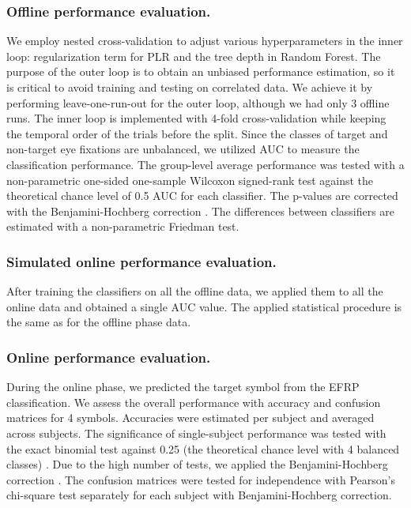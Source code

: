 \documentclass[12pt]{iopart}
\begin{document}
\subsubsection*{Offline performance evaluation.}
We employ nested cross-validation to adjust various hyperparameters in the inner loop:
regularization term for PLR and the tree depth in Random Forest.
The purpose of the outer loop is to obtain an unbiased performance estimation,
so it is critical to avoid training and testing on correlated data.
We achieve it by performing leave-one-run-out for the outer loop,
although we had only 3 offline runs.
The inner loop is implemented with 4-fold cross-validation while keeping
the temporal order of the trials before the split.
Since the classes of target and non-target eye fixations are unbalanced,
we utilized AUC to measure the classification performance.
The group-level average performance was tested with a non-parametric one-sided one-sample Wilcoxon signed-rank test against the theoretical chance level of 0.5 AUC for each classifier.
The p-values are corrected with 
the Benjamini-Hochberg correction \cite{benjamini_controlling_1995}.
The differences between classifiers are estimated with a non-parametric Friedman test.

\subsubsection*{Simulated online performance evaluation.}
After training the classifiers on all the offline data, we applied them 
to all the online data and obtained a single AUC value.
The applied statistical procedure is the same as for the offline phase data.

\subsubsection*{Online performance evaluation.}
During the online phase, we predicted the target symbol from the EFRP classification.
We assess the overall performance with accuracy and confusion matrices
for 4 symbols. Accuracies were estimated per subject and averaged across subjects.
The significance of single-subject performance was tested with the exact binomial test against
0.25 (the theoretical chance level with 4 balanced classes) \cite{muller-putz_better_2008}.
Due to the high number of tests,
we applied the Benjamini-Hochberg correction \cite{benjamini_controlling_1995}.
The confusion matrices were tested for independence
with Pearson's chi-square test \cite{frs_x_1900} separately for each subject 
with Benjamini-Hochberg correction.
\end{document}

